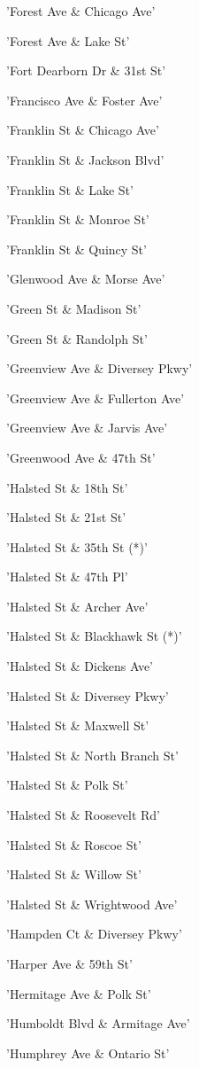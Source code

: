 \documentclass[11pt]{article}
\begin{document}
\begin{enumerate*}
\item 'Forest Ave \& Chicago Ave'
\item 'Forest Ave \& Lake St'
\item 'Fort Dearborn Dr \& 31st St'
\item 'Francisco Ave \& Foster Ave'
\item 'Franklin St \& Chicago Ave'
\item 'Franklin St \& Jackson Blvd'
\item 'Franklin St \& Lake St'
\item 'Franklin St \& Monroe St'
\item 'Franklin St \& Quincy St'
\item 'Glenwood Ave \& Morse Ave'
\item 'Green St \& Madison St'
\item 'Green St \& Randolph St'
\item 'Greenview Ave \& Diversey Pkwy'
\item 'Greenview Ave \& Fullerton Ave'
\item 'Greenview Ave \& Jarvis Ave'
\item 'Greenwood Ave \& 47th St'
\item 'Halsted St \& 18th St'
\item 'Halsted St \& 21st St'
\item 'Halsted St \& 35th St (*)'
\item 'Halsted St \& 47th Pl'
\item 'Halsted St \& Archer Ave'
\item 'Halsted St \& Blackhawk St (*)'
\item 'Halsted St \& Dickens Ave'
\item 'Halsted St \& Diversey Pkwy'
\item 'Halsted St \& Maxwell St'
\item 'Halsted St \& North Branch St'
\item 'Halsted St \& Polk St'
\item 'Halsted St \& Roosevelt Rd'
\item 'Halsted St \& Roscoe St'
\item 'Halsted St \& Willow St'
\item 'Halsted St \& Wrightwood Ave'
\item 'Hampden Ct \& Diversey Pkwy'
\item 'Harper Ave \& 59th St'
\item 'Hermitage Ave \& Polk St'
\item 'Humboldt Blvd \& Armitage Ave'
\item 'Humphrey Ave \& Ontario St'

\end{enumerate*}
\end{document}
